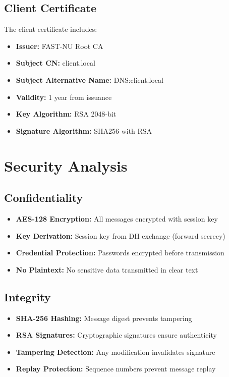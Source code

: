 \documentclass[runningheads]{llncs}
\begin{document}
\subsection{Client Certificate}

The client certificate includes:
\begin{itemize}
    \item \textbf{Issuer:} FAST-NU Root CA
    \item \textbf{Subject CN:} client.local
    \item \textbf{Subject Alternative Name:} DNS:client.local
    \item \textbf{Validity:} 1 year from issuance
    \item \textbf{Key Algorithm:} RSA 2048-bit
    \item \textbf{Signature Algorithm:} SHA256 with RSA
\end{itemize}

\section{Security Analysis}

\subsection{Confidentiality}

\begin{itemize}
    \item \textbf{AES-128 Encryption:} All messages encrypted with session key
    \item \textbf{Key Derivation:} Session key from DH exchange (forward secrecy)
    \item \textbf{Credential Protection:} Passwords encrypted before transmission
    \item \textbf{No Plaintext:} No sensitive data transmitted in clear text
\end{itemize}

\subsection{Integrity}

\begin{itemize}
    \item \textbf{SHA-256 Hashing:} Message digest prevents tampering
    \item \textbf{RSA Signatures:} Cryptographic signatures ensure authenticity
    \item \textbf{Tampering Detection:} Any modification invalidates signature
    \item \textbf{Replay Protection:} Sequence numbers prevent message replay
\end{itemize}
\end{document}
